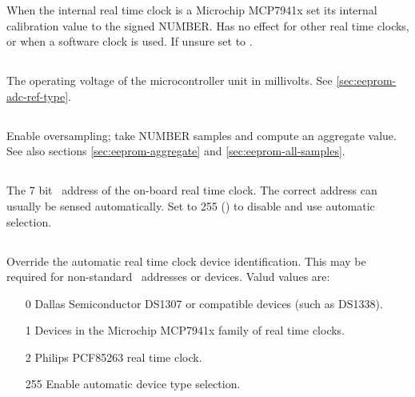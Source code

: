 When the internal real time clock is a Microchip MCP7941x set its internal
calibration value to the signed NUMBER. Has no effect for other real time
clocks, or when a software clock is used. If unsure set to .

\subsection[mcu-voltage-mv]{}
\label{sec:eeprom-mcu-voltage-mv}

The operating voltage of the microcontroller unit in millivolts. See
\ref{sec:eeprom-adc-ref-type}.

\subsection[num-samples]{}
\label{sec:eeprom-num-samples}

Enable oversampling; take NUMBER samples and compute an aggregate
value. See also sections \ref{sec:eeprom-aggregate} and
\ref{sec:eeprom-all-samples}.


\subsection[rtc-device-address]{}

The 7 bit \itwoc\ address of the on-board real time clock. The correct
address can usually be sensed automatically. Set to 255 ()
to disable and use automatic selection.

\subsection[rtcx-device-type]{}
Override the automatic real time clock device identification. This may
be required for non-standard \itwoc\ addresses or devices. Valud
values are:
\begin{enumerate}
\item[0] Dallas Semiconductor DS1307 or compatible devices (such as
  DS1338).
\item[1] Devices in the Microchip MCP7941x family of real time clocks.
\item[2] Philips PCF85263 real time clock.
\item[255] Enable automatic device type selection.
\end{enumerate}



